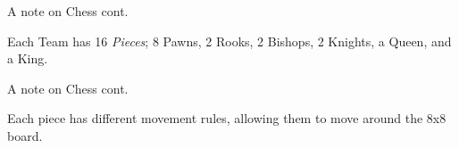 \documentclass{beamer}
\begin{document}
\begin{frame}{A note on Chess cont.}

Each Team has 16 \emph{Pieces}; 8 Pawns, 2 Rooks, 2 Bishops, 2 Knights, a Queen, and a King.
    
\begin{overprint}
    
\begin{figure}[h]
    \centering
    \showboard
    \label{showpiece0}
\end{figure}

\begin{figure}[h]
    \centering
    \newgame
    \showboard
    \label{showpiece1}
\end{figure}

\begin{figure}[h]
    \centering
    \newgame
    \showboard
    \label{showpiece2}
\end{figure}

\begin{figure}[h]
    \centering
    \newgame
    \showboard
    \label{showpiece3}
\end{figure}

\begin{figure}[h]
    \centering
    \newgame
    \showboard
    \label{showpiece4}
\end{figure}

\begin{figure}[h]
    \centering
    \newgame
    \showboard
    \label{showpiece5}
\end{figure}

\begin{figure}[h]
    \centering
    \newgame
    \showboard
    \label{showpiece6}
\end{figure}

\end{overprint}
    
\end{frame}

\begin{frame}{A note on Chess cont.}

Each piece has different movement rules, allowing them to move around the 8x8 board.
    
\begin{figure}[h]
    \centering
    \newgame
    \scalebox{0.60}{\showboard}
    \quad
    \scalebox{0.60}{\showboard}
    \label{demonstratemovement}
\end{figure}
    
\end{frame}
\end{document}
